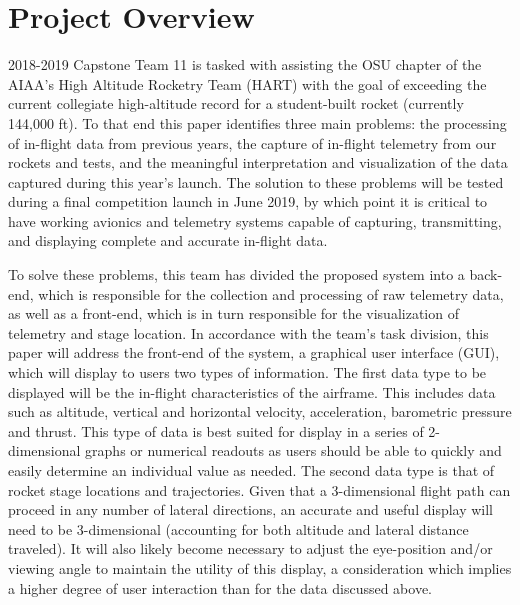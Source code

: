 \documentclass[onecolumn, draftclsnofoot,10pt, compsoc]{IEEEtran}
\begin{document}


\section{Project Overview}
	2018-2019 Capstone Team 11 is tasked with assisting the OSU chapter of the AIAA's High Altitude Rocketry Team (HART) with the goal of exceeding the current collegiate high-altitude record for a student-built rocket (currently 144,000 ft). 
	To that end this paper identifies three main problems: the processing of in-flight data from previous years, the capture of in-flight telemetry from our rockets and tests, and the meaningful interpretation and visualization of the data captured during this year's launch.
	The solution to these problems will be tested during a final competition launch in June 2019, by which point it is critical to have working avionics and telemetry systems capable of capturing, transmitting, and displaying complete and accurate in-flight data.
	
	\par To solve these problems, this team has divided the proposed system into a back-end, which is responsible for the collection and processing of raw telemetry data, as well as a front-end, which is in turn responsible for the visualization of telemetry and stage location.
	In accordance with the team's task division, this paper will address the front-end of the system, a graphical user interface (GUI), which will display to users two types of information.
	The first data type to be displayed will be the in-flight characteristics of the airframe.
	This includes data such as altitude, vertical and horizontal velocity, acceleration, barometric pressure and thrust.
	This type of data is best suited for display in a series of 2-dimensional graphs or numerical readouts as users should be able to quickly and easily determine an individual value as needed. 
	The second data type is that of rocket stage locations and trajectories.
	Given that a 3-dimensional flight path can proceed in any number of lateral directions, an accurate and useful display will need to be 3-dimensional (accounting for both altitude and lateral distance traveled).
	It will also likely become necessary to adjust the eye-position and/or viewing angle to maintain the utility of this display, a consideration which implies a higher degree of user interaction than for the data discussed above.
	
\end{document}
